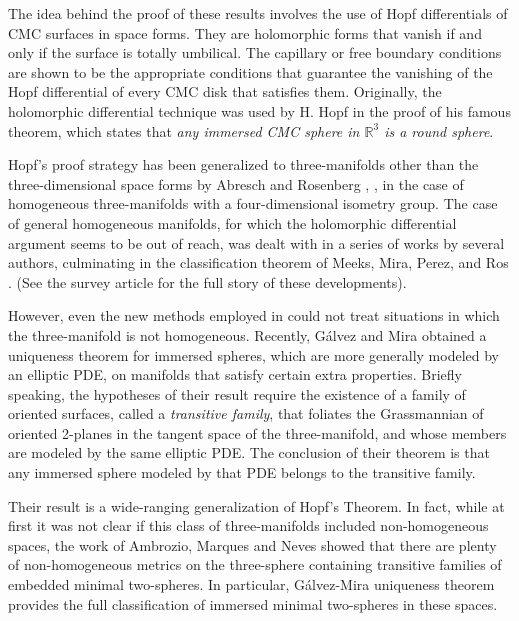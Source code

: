 \documentclass[11pt,reqno]{amsart}
\begin{document}
The idea behind the proof of these results involves the use of Hopf differentials of CMC surfaces in space forms. They are holomorphic forms that vanish if and only if the surface is totally umbilical. The capillary or free boundary conditions are shown to be the appropriate conditions that guarantee the vanishing of the Hopf differential of every CMC disk that satisfies them. Originally, the holomorphic differential technique was used by H. Hopf \cite{Hopf1951} in the proof of his famous theorem, which states that \textit{any immersed CMC sphere in $\mathbb{R}^3$ is a round sphere}. 

Hopf's proof strategy has been generalized to three-manifolds other than the three-dimensional space forms by Abresch and Rosenberg \cite{AbrRos1}, \cite{AbrRos2}, in the case of homogeneous three-manifolds with a four-dimensional isometry group. The case of general homogeneous manifolds, for which the holomorphic differential argument seems to be out of reach, was dealt with in a series of works by several authors, culminating in the classification theorem of Meeks, Mira, Perez, and Ros \cite{MeeMirPerRos}. (See the survey article \cite{MirPer} for the full story of these developments).

However, even the new methods employed in \cite{MeeMirPerRos} could not treat situations in which the three-manifold is not homogeneous. Recently, Gálvez and Mira \cite{Galvez-Mira-Uniqueness} obtained a uniqueness theorem for immersed spheres, which are more generally modeled by an elliptic PDE, on manifolds that satisfy certain extra properties. Briefly speaking, the hypotheses of their result require the existence of a family of oriented surfaces, called a \textit{transitive family}, that foliates the Grassmannian of oriented 2-planes in the tangent space of the three-manifold, and whose members are modeled by the same elliptic PDE. The conclusion of their theorem is that any immersed sphere modeled by that PDE belongs to the transitive family. 

Their result is a wide-ranging generalization of Hopf's Theorem. In fact, while at first it was not clear if this class of three-manifolds included non-homogeneous spaces, the work of Ambrozio, Marques and Neves \cite{AmbMarNev} showed that there are plenty of non-homogeneous metrics on the three-sphere containing transitive families of embedded minimal two-spheres. In particular, Gálvez-Mira uniqueness theorem provides the full classification of immersed minimal two-spheres in these spaces.
\end{document}
